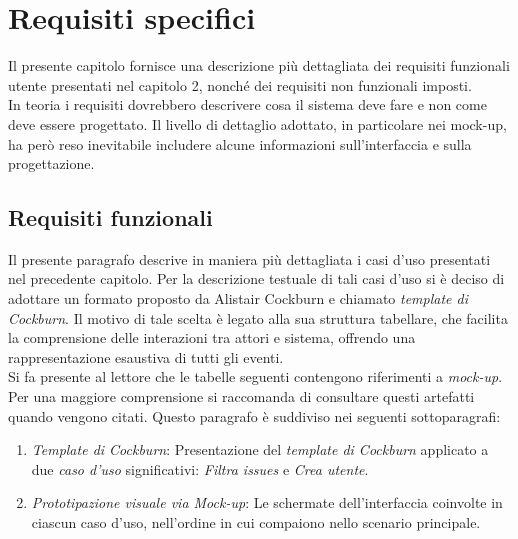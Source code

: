 \chapter{Requisiti specifici} %

\label{Chapter3} %



Il presente capitolo fornisce una descrizione più dettagliata dei requisiti funzionali 
utente presentati nel capitolo 2, nonché dei requisiti non funzionali imposti. \\
\indent In teoria i requisiti dovrebbero descrivere cosa il sistema deve fare e non come deve essere progettato. Il livello di dettaglio adottato, in particolare nei mock-up, ha però reso inevitabile includere alcune informazioni sull'interfaccia e sulla progettazione.

\section{Requisiti funzionali}

Il presente paragrafo descrive in maniera più dettagliata i casi d’uso presentati nel precedente capitolo. Per la descrizione testuale di tali casi d’uso si è deciso di adottare un formato proposto da Alistair Cockburn e chiamato \textit{template di Cockburn}. Il motivo di tale scelta è legato alla sua struttura tabellare, che facilita la comprensione
delle interazioni tra attori e sistema, offrendo una rappresentazione esaustiva di tutti
gli eventi. \\
\indent Si fa presente al lettore che le tabelle seguenti contengono riferimenti a \textit{mock-up}. Per una maggiore comprensione si raccomanda di consultare questi artefatti quando vengono citati. Questo paragrafo è suddiviso nei seguenti sottoparagrafi: \\

\begin{enumerate}
    \item \textit{Template di Cockburn}: Presentazione del \textit{template di Cockburn} applicato a due \textit{caso d'uso} significativi: \textit{Filtra issues} e \textit{Crea utente}.
    \item \textit{Prototipazione visuale via Mock-up}: Le schermate dell'interfaccia coinvolte in ciascun caso d'uso, nell'ordine in cui compaiono nello scenario principale.
\end{enumerate}

